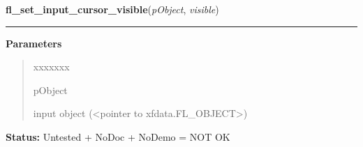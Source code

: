 \hspace{.8\funcindent}\begin{boxedminipage}{\funcwidth}

    \raggedright \textbf{fl\_set\_input\_cursor\_visible}(\textit{pObject}, \textit{visible})

    \vspace{-1.5ex}

    \rule{\textwidth}{0.5\fboxrule}
\setlength{\parskip}{2ex}
\setlength{\parskip}{1ex}
      \textbf{Parameters}
      \vspace{-1ex}

      \begin{quote}
        \begin{Ventry}{xxxxxxx}

          \item[pObject]

          input object ({\textless}pointer to 
          xfdata.FL\_OBJECT{\textgreater})

        \end{Ventry}

      \end{quote}

\textbf{Status:} Untested + NoDoc + NoDemo = NOT OK



    \end{boxedminipage}

    \label{xformslib:library:fl_get_input_numberoflines}

    \vspace{0.5ex}

